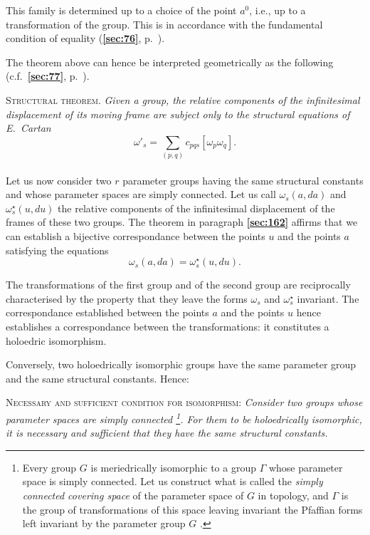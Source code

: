 \documentclass[leqno,11pt]{book}
\numberwithin{equation}{chapter}
\theoremstyle{shape1}
\theoremstyle{shapesmall}
\newcommand{\fsref}[1]{{\rm\textsection\textbf{\ref{sec:#1}}}}
\newcommand{\str}{^{\star}}
\newcommand{\somespace}{\vspace{9pt}}
\begin{document}
This family is determined up to a choice of the point $a^{0}$, i.e., up to a transformation of the group. This is in accordance with the fundamental condition of equality (\fsref{76}, p.~\pageref{sec:76}).

The theorem above can hence be interpreted geometrically as the following (c.f.~\fsref{77}, p.~\pageref{sec:77}).

\somespace

\textsc{Structural theorem}. \emph{Given a group, the relative components of the infinitesimal displacement of its moving frame are subject only to the structural equations of E.~Cartan}
\[
\omega'_{s}=\sum_{(p,q)}c_{pqs}[\omega_{p}\omega_{q}].
\]


\paragraph{}
\label{sec:164}
Let us now consider two $r$ parameter groups having the same structural constants and whose parameter spaces are simply connected. Let us call $\omega_{s}(a,da)$ and $\omega_{s}\str(u,du)$ the relative components of the infinitesimal displacement of the frames of these two groups. The theorem in paragraph \fsref{162} affirms that we can establish a bijective correspondance between the points $u$ and the points $a$ satisfying the equations
\[
\omega_{s}(a,da)=\omega_{s}\str(u,du).
\]

The transformations of the first group and of the second group are reciprocally characterised by the property that they leave the forms $\omega_{s}$ and $\omega_{s}\str$ invariant. The correspondance established between the points $a$ and the points $u$ hence establishes a correspondance between the transformations: it constitutes a holoedric isomorphism.

Conversely, two holoedrically isomorphic groups have the same parameter group and the same structural constants. Hence:

\somespace

\textsc{Necessary and sufficient condition for isomorphism:} \emph{Consider two groups whose parameter spaces are simply connected \footnote{Every group $G$ is meriedrically isomorphic to a group $\Gamma$ whose parameter space is simply connected. Let us construct what is called the \emph{simply connected covering space} of the parameter space of $G$ in topology, and $\Gamma$ is the group of transformations of this space leaving invariant the Pfaffian forms left invariant by the parameter group $G$ \cite{15}.}. For them to be holoedrically isomorphic, it is necessary and sufficient that they have the same structural constants.}
\end{document}
